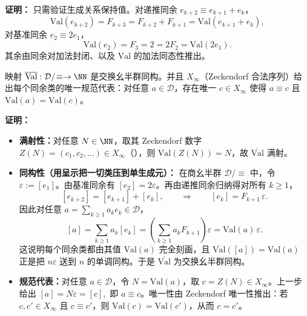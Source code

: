 \textbf{证明：}
只需验证生成关系保持值。对递推同余 $e_{k+2}\equiv e_{k+1}+e_k$，
\[
\mathrm{Val}(e_{k+2})=F_{k+3}=F_{k+2}+F_{k+1}=\mathrm{Val}(e_{k+1}+e_k),
\]
对基准同余 $e_2\equiv 2e_1$，
\[
\mathrm{Val}(e_2)=F_3=2=2F_2=\mathrm{Val}(2e_1).
\]
其余由同余对加法封闭、以及 $\mathrm{Val}$ 的加法同态性推出。

\begin{theorem}\label{thm:monoid-quotient-is-N}
映射 $\overline{\mathrm{Val}}:\mathcal{D}/\!\equiv \to \NN$ 是交换幺半群同构。并且 $X_\infty$（Zeckendorf 合法序列）给出每个同余类的唯一规范代表：对任意 $a\in\mathcal{D}$，存在唯一 $c\in X_\infty$ 使得 $a\equiv c$ 且 $\mathrm{Val}(a)=\mathrm{Val}(c)$。
\end{theorem}

\textbf{证明：}
\begin{itemize}
  \item \textbf{满射性：}对任意 $N\in\NN$，取其 Zeckendorf 数字 $Z(N)=(c_1,c_2,\dots)\in X_\infty$（\cite{Zeckendorf1972}），则 $\mathrm{Val}(Z(N))=N$，故 $\overline{\mathrm{Val}}$ 满射。
  \item \textbf{同构性（用呈示把一切类压到单生成元）：}
  在商幺半群 $\mathcal{D}/\!\equiv$ 中，令 $\varepsilon:=[e_1]$。由基准同余有 $[e_2]=2\varepsilon$。再由递推同余归纳得对所有 $k\ge 1$，
  \[
  [e_{k+2}]=[e_{k+1}]+[e_k],
  \qquad
  \Rightarrow\qquad
  [e_k]=F_{k+1}\,\varepsilon.
  \]
  因此对任意 $a=\sum_{k\ge 1} a_k e_k\in\mathcal{D}$，
  \[
  [a]=\sum_{k\ge 1} a_k [e_k]=\left(\sum_{k\ge 1} a_k F_{k+1}\right)\varepsilon
  =\mathrm{Val}(a)\,\varepsilon.
  \]
这说明每个同余类都由其值 $\mathrm{Val}(a)$ 完全刻画，且 $\overline{\mathrm{Val}}([a])=\mathrm{Val}(a)$ 正是把 $n\varepsilon$ 送到 $n$ 的单调同构。于是 $\overline{\mathrm{Val}}$ 为交换幺半群同构。
  \item \textbf{规范代表：}对任意 $a\in\mathcal{D}$，令 $N=\mathrm{Val}(a)$，取 $c=Z(N)\in X_\infty$。上一步给出
  \(
  [a]=N\varepsilon=[c],
  \)
  即 $a\equiv c$。唯一性由 Zeckendorf 唯一性推出：若 $c,c'\in X_\infty$ 且 $c\equiv c'$，则 $\mathrm{Val}(c)=\mathrm{Val}(c')$，从而 $c=c'$。
\end{itemize}

